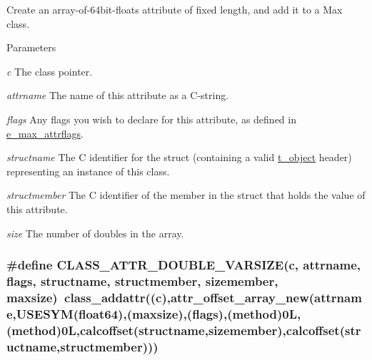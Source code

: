 Create an array-\/of-\/64bit-\/floats attribute of fixed length, and add it to a Max class. 
\begin{DoxyParams}{Parameters}
\item[{\em c}]The class pointer. \item[{\em attrname}]The name of this attribute as a C-\/string. \item[{\em flags}]Any flags you wish to declare for this attribute, as defined in \hyperlink{group__attr_gaf296cfc6741bb19207f6ed8062809115}{e\_\-max\_\-attrflags}. \item[{\em structname}]The C identifier for the struct (containing a valid \hyperlink{structt__object}{t\_\-object} header) representing an instance of this class. \item[{\em structmember}]The C identifier of the member in the struct that holds the value of this attribute. \item[{\em size}]The number of doubles in the array. \end{DoxyParams}
\hypertarget{group__attr_ga5fec0fa1c1f4d249bf363a6b8da58ff2}{
\subsubsection[{CLASS\_\-ATTR\_\-DOUBLE\_\-VARSIZE}]{\setlength{\rightskip}{0pt plus 5cm}\#define CLASS\_\-ATTR\_\-DOUBLE\_\-VARSIZE(c, \/  attrname, \/  flags, \/  structname, \/  structmember, \/  sizemember, \/  maxsize)~class\_\-addattr((c),attr\_\-offset\_\-array\_\-new(attrname,USESYM(float64),(maxsize),(flags),({\bf method})0L,(method)0L,calcoffset(structname,sizemember),calcoffset(structname,structmember)))}}
\label{group__attr_ga5fec0fa1c1f4d249bf363a6b8da58ff2}


